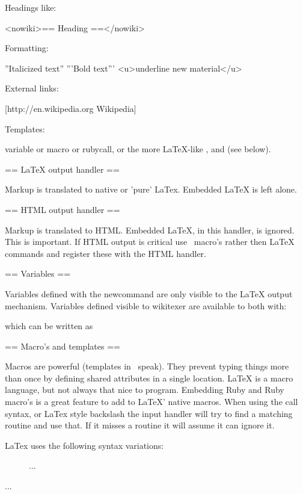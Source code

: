 Headings like:

<nowiki>== Heading ==</nowiki>

Formatting:

''Italicized text''
'''Bold text'''
<u>underline new material</u>

External links:

[http://en.wikipedia.org Wikipedia]

Templates:

{{variable}} or {{macro}} or {{rubycall}}, or the more LaTeX-like
\variable, \macro and \rubycall (see below).


== LaTeX output handler ==

Markup is translated to native or 'pure' LaTex. Embedded LaTeX is left alone.


== HTML output handler ==

Markup is translated to HTML. Embedded LaTeX, in this handler, is
ignored. This is important. If HTML output is critical use \wikitexer\
macro's rather then LaTeX commands and register these with the HTML
handler.

== Variables ==

Variables defined with the newcommand are only visible to the LaTeX
output mechanism. Variables defined visible to wikitexer are available
to both with:


which can be written as


== Macro's and templates ==

Macros are powerful (templates in \mediawiki\ speak). They prevent
typing things more than once by defining shared attributes in a single
location.  LaTeX is a macro language, but not always that nice to
program.  Embedding Ruby and Ruby macro's is a great feature to add to
LaTeX' native macros. When using the {{call}} syntax, or LaTex style
backslash \call the input handler will try to find a matching routine
and use that. If it misses a routine it will assume it can ignore it.

LaTex uses the following syntax variations:

	\hfill
	\caption{This is the caption.\label{fig:rawss}}

  \begin{figure} ... \end{figure}
  \begin{minipage}[t]{0.58\linewidth} ... \end{minipage} %

